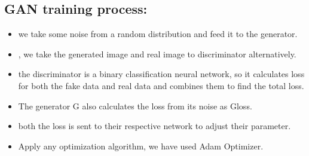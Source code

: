 \documentclass[runningheads]{llncs}
\begin{document}
\subsection{\textbf{GAN training process:}}
\newline
\begin{itemize}
  \item we take some noise from a random distribution and feed it to the generator. 
  \item, we take the generated image and real image to discriminator alternatively.
  \item the discriminator is a binary classification neural network, so it calculates loss for both the fake data and real data and combines them to find the total loss.
  \item The generator G also calculates the loss from its noise as Gloss.
  \item both the loss is sent to their respective network to adjust their parameter.
  \item Apply any optimization algorithm, we have used Adam Optimizer.
\end{itemize}
\newline
\end{document}
